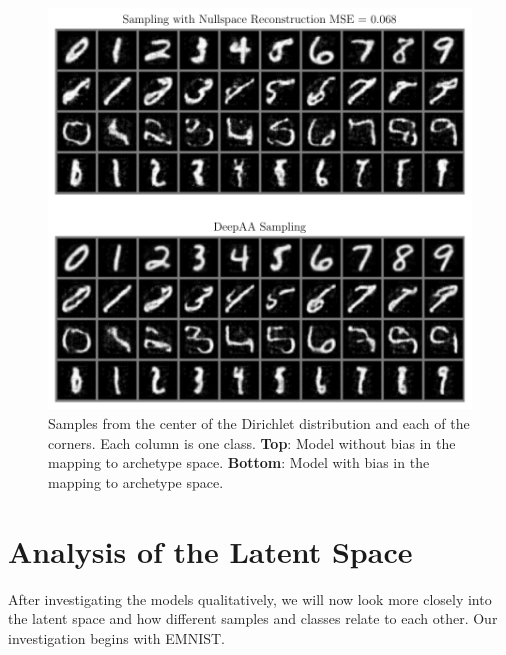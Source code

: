 \begin{figure}[htpb]
	\centering
        \includegraphics{figures/samples/aa_nullspace_bias_y.pdf}
        \caption{Samples from the center of the Dirichlet distribution and each
        of the corners. Each column is one class. \textbf{Top}: Model without bias in
        the mapping to archetype space. \textbf{Bottom}: Model with bias in the mapping to
        archetype space.}%
        \label{fig:aa_nullspace_bias}
\end{figure}

\section{Analysis of the Latent Space}%
\label{sec:analysis_of_the_latent_space}

After investigating the models qualitatively, we will now look more closely
into the latent space and how different samples and classes relate to each
other. Our investigation begins with EMNIST.

